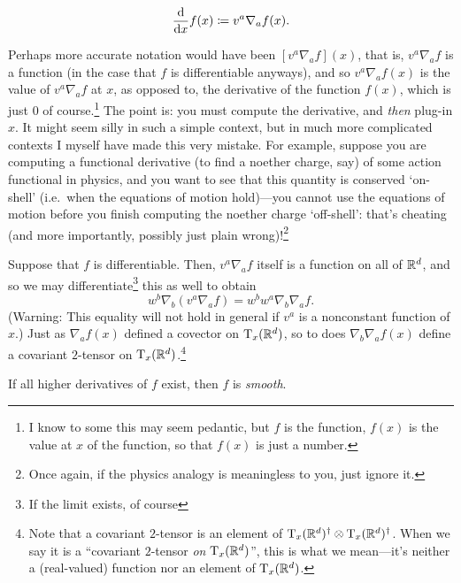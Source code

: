 \begin{dfn}
\begin{savenotes}
\begin{rmk}
\begin{equation}
\frac{\mathop{}\!\mathrm{d}}{\mathop{}\!\mathrm{d} x}f(x)\coloneqq v^a\nabla _af(x).
\end{equation}
\end{rmk}
\begin{rmk}
Perhaps more accurate notation would have been $[v^a\nabla _af](x)$, that is, $v^a\nabla _af$ is a function (in the case that $f$ is differentiable anyways), and so $v^a\nabla _af(x)$ is the value of $v^a\nabla _af$ at $x$, as opposed to, the derivative of the function $f(x)$, which is just $0$ of course.\footnote{I know to some this may seem pedantic, but $f$ is the function, $f(x)$ is the value at $x$ of the function, so that $f(x)$ is just a number.}  The point is:  you must compute the derivative, and \emph{then} plug-in $x$.  It might seem silly in such a simple context, but in much more complicated contexts I myself have made this very mistake.  For example, suppose you are computing a functional derivative (to find a noether charge, say) of some action functional in physics, and you want to see that this quantity is conserved `on-shell' (i.e.~when the equations of motion hold)---you cannot use the equations of motion before you finish computing the noether charge `off-shell':  that's cheating (and more importantly, possibly just plain wrong)!\footnote{Once again, if the physics analogy is meaningless to you, just ignore it.}
\end{rmk}
\begin{rmk}
Suppose that $f$ is differentiable.  Then, $v^a\nabla _af$ itself is a function on all of $\mathbb{R} ^d$, and so we may differentiate\footnote{If the limit exists, of course} this as well to obtain
\begin{equation}
w^b\nabla _b(v^a\nabla _af)=w^bw^a\nabla _b\nabla _af.
\end{equation}
(Warning:  This equality will not hold in general if $v^a$ is a nonconstant function of $x$.)  Just as $\nabla _af(x)$ defined a covector on $\tangent[\R ^d][x]$, so to does $\nabla _b\nabla _af(x)$ define a covariant $2$-tensor on $\tangent[\R ^d][x]$.\footnote{Note that a covariant $2$-tensor is an element of $\tangent[\R ^d][x]^\dagger \otimes \tangent[\R ^d][x]^\dagger$.  When we say it is a ``covariant $2$-tensor \emph{on} $\tangent[\R ^d][x]$'', this is what we mean---it's neither a (real-valued) function nor an element of $\tangent[\R ^d][x]$.}
\end{rmk}
\begin{rmk}
If all higher derivatives of $f$ exist, then $f$ is \emph{smooth}.
\end{rmk}
\end{savenotes}
\end{dfn}
